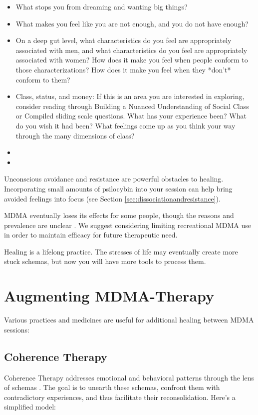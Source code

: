 \documentclass[12pt,letterpaper]{article}
\begin{document}
\begin{itemize}
    \item What stops you from dreaming and wanting big things?
    \item What makes you feel like you are not enough, and you do not have enough?
    \item On a deep gut level, what characteristics do you feel are appropriately associated with men, and what characteristics do you feel are appropriately associated with women? How does it make you feel when people conform to those characterizations? How does it make you feel when they *don't* conform to them?
    \item Class, status, and money: If this is an area you are interested in exploring, consider reading through Building a Nuanced Understanding of Social Class or Compiled sliding scale questions. What has your experience been? What do you wish it had been? What feelings come up as you think your way through the many dimensions of class?
    \item {}
    \item {}
\end{itemize}
Unconscious avoidance and resistance are powerful obstacles to healing. Incorporating small amounts of psilocybin into your session can help bring avoided feelings into focus (see Section \ref{sec:dissociationandresistance}).

MDMA eventually loses its effects for some people, though the reasons and prevalence are unclear \cite{parrottTolerance}. We suggest considering limiting recreational MDMA use in order to maintain efficacy for future therapeutic need.

Healing is a lifelong practice. The stresses of life may eventually create more stuck schemas, but now you will have more tools to process them.
\section{Augmenting MDMA-Therapy}
\label{healingPractices}
Various practices and medicines are useful for additional healing between MDMA sessions:
\subsection{Coherence Therapy}
Coherence Therapy addresses emotional and behavioral patterns through the lens of schemas \cite{eckerUnlocking}. The goal is to unearth these schemas, confront them with contradictory experiences, and thus facilitate their reconsolidation. Here's a simplified model:  
\end{document}
